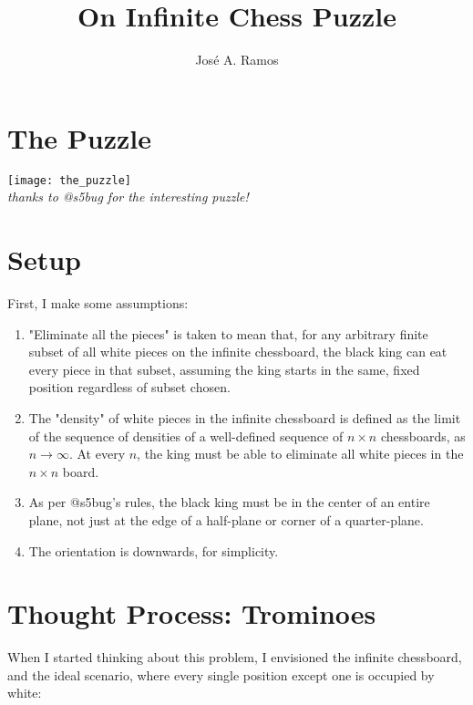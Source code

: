 \documentclass{article}
\title{On Infinite Chess Puzzle}
\author
{
José A. Ramos
}
\begin{document}
    \maketitle
    
    \section*{The Puzzle}

    \texttt{[image: the\_puzzle]} \\
    \textit{thanks to @s5bug for the interesting puzzle!}

    \section*{Setup}

    First, I make some assumptions:
    \begin{enumerate}
    \item "Eliminate all the pieces" is taken to mean that, for any arbitrary finite subset of all white pieces on the infinite chessboard, the black king can eat every piece in that subset, assuming the king starts in the same, fixed position regardless of subset chosen. 
    \item The "density" of white pieces in the infinite chessboard is defined as the limit of the sequence of densities of a well-defined sequence of $n \times n$ chessboards, as $n \to \infty$. At every $n$, the king must be able to eliminate all white pieces in the $n \times n$ board.
    \item As per @s5bug's rules, the black king must be in the center of an entire plane, not just at the edge of a half-plane or corner of a quarter-plane.
    \item The orientation is downwards, for simplicity.
    \end{enumerate}

    \section*{Thought Process: Trominoes}
    When I started thinking about this problem, I envisioned the infinite chessboard, and the ideal scenario, where every single position except one is occupied by white:

    \newgame
    \def\myfen{PPPPPPPPPPP/PPPPPPPPPPP/PPPPPPPPPPP/PPPPPPPPPPP/PPPPPPPPPPP/PPPPPkPPPPP/PPPPPPPPPPP/PPPPPPPPPPP/PPPPPPPPPPP/PPPPPPPPPPP/PPPPPPPPPPP} %
    \chessboard[
        maxfield=k11,
        clearboard,
        startfen=a11,
        setfen=\myfen,
        addfen=\myfen]
\end{document}
